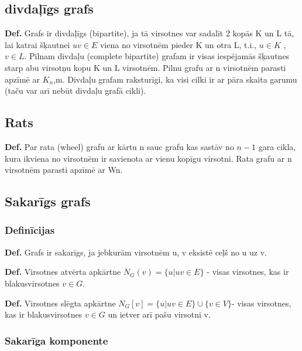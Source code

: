 \documentclass{article}
\begin{document}
\subsection{divdaļīgs grafs}

\textbf{Def.}  Grafs ir divdaļīgs (bipartite), ja tā virsotnes var sadalīt 2 kopās K un L tā, lai katrai šķautnei $uv \in E$ viena no virsotnēm pieder K un otra L, t.i., $u \in K$ , $v \in L$.  Pilnam divdaļu (complete bipartite) grafam ir visas iespējamās šķautnes starp abu virsotņu kopu K un L virsotnēm.  Pilnu grafu ar n virsotnēm parasti apzīmē ar $K_n$,m.  Divdaļu grafam raksturīgi, ka visi cilki ir ar pāra skaita garumu (taču var arī nebūt divdaļu grafā cikli).


\subsection{Rats}

\textbf{Def.}  Par rata (wheel) grafu ar kārtu n sauc grafu kas sastāv no $n-1$ gara cikla, kura ikviena no virsotnēm ir savienota ar vienu kopīgu virsotni.  Rata grafu ar n virsotnēm parasti apzīmē ar Wn.

\subsection{Sakarīgs grafs}

\subsubsection{Definīcijas}

\textbf{Def.}  Grafs ir sakarīgs, ja jebkurām virsotnēm u, v eksistē ceļš no u uz v.


\textbf{Def.} Virsotnes atvērta apkārtne $N_G (v ) = \{u|uv \in E \}$ - visas virsotnes, kas ir blakusvirsotnes $v \in G$.

\textbf{Def.} Virsotnes slēgta apkārtne $N_G [v ] = \{u|uv \in E \} \cup \{v \in V \} $- visas virsotnes, kas ir blakusvirsotnes $v \in G$ un ietver arī pašu virsotni v.

\subsubsection{Sakarīga komponente}
\end{document}
